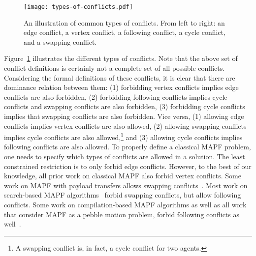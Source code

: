 \documentclass[letterpaper]{article} %
\begin{document}
\begin{figure}
    \centering
    \texttt{[image: types-of-conflicts.pdf]}
    \caption{An illustration of common types of conflicts. From left to right: an edge conflict, a vertex conflict, a following conflict, a cycle conflict, and a swapping conflict.}
    \label{fig:types-of-conflicts}
\end{figure}
Figure~\ref{fig:types-of-conflicts} illustrates the different types of conflicts. Note that the above set of conflict definitions is certainly not a complete set of all possible conflicts.
Considering the formal definitions of these conflicts, it is clear that there are dominance relation between them: (1) forbidding vertex conflicts implies edge conflicts are also forbidden, (2) forbidding following conflicts implies cycle conflicts and swapping conflicts are also forbidden, (3) forbidding cycle conflicts implies that swapping conflicts are also forbidden. Vice versa, (1) allowing edge conflicts implies vertex conflicts are also allowed,
(2) allowing swapping conflicts implies cycle conflicts are also allowed,\footnote{A swapping conflict is, in fact, a cycle conflict for two agents.}
and (3) allowing cycle conflicts implies following conflicts are also allowed.
To properly define a classical MAPF problem, one needs to specify which types of conflicts are allowed in a solution.
The least constrained restriction is to only forbid edge conflicts.
However, to the best of our knowledge,
all prior work on classical MAPF also forbid vertex conflicts. Some work on MAPF with payload transfers allows swapping conflicts~\cite{MaAAAI16}.
Most work on search-based MAPF algorithms~\cite{standley2010finding,felner2017search} forbid swapping conflicts, but allow following conflicts.
Some work on compilation-based MAPF algorithms
as well as all work that consider MAPF as a pebble motion problem, forbid following conflicts as well~\cite{surynek2016empirical,bartak2017modeling}.
\end{document}
